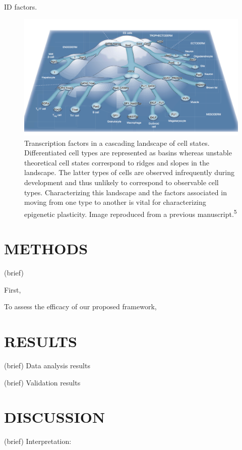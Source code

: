 \documentclass[12pt]{article}
\begin{document}
ID factors. 

\begin{center}
\begin{figure}[h]
\includegraphics[width=0.85\paperwidth]{tf_landscape.png}
\caption{Transcription factors in a cascading landscape of cell states. Differentiated cell types are represented as basins whereas unstable theoretical cell states correspond to ridges and slopes in the landscape. The latter types of cells are observed infrequently during development and thus unlikely to correspond to observable cell types. Characterizing this landscape and the factors associated in moving from one type to another is vital for characterizing epigenetic plasticity. Image reproduced from a previous manuscript.\textsuperscript{5}}
\end{figure}
\end{center}

 \section{\textbf{{\Large M}{\small ETHODS}}}
 (brief)
 
 First, 
 
 To assess the efficacy of our proposed framework, 

 \section{\textbf{{\Large R}{\small ESULTS}}}
(brief) Data analysis results

(brief) Validation results

 \section{\textbf{{\Large D}{\small ISCUSSION}}}
(brief) Interpretation: 
\end{document}

